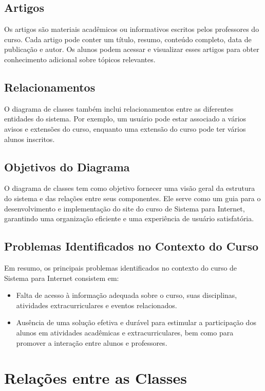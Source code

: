 \documentclass[a4paper,12pt]{report}
\begin{document}
\subsection{Artigos}
 
Os artigos são materiais acadêmicos ou informativos escritos pelos professores do curso. Cada artigo pode conter um título, resumo, conteúdo completo, data de publicação e autor. Os alunos podem acessar e visualizar esses artigos para obter conhecimento adicional sobre tópicos relevantes.
 
\subsection{Relacionamentos}
 
O diagrama de classes também inclui relacionamentos entre as diferentes entidades do sistema. Por exemplo, um usuário pode estar associado a vários avisos e extensões do curso, enquanto uma extensão do curso pode ter vários alunos inscritos.
 
\subsection{Objetivos do Diagrama}
 
O diagrama de classes tem como objetivo fornecer uma visão geral da estrutura do sistema e das relações entre seus componentes. Ele serve como um guia para o desenvolvimento e implementação do site do curso de Sistema para Internet, garantindo uma organização eficiente e uma experiência de usuário satisfatória.

\subsection{Problemas Identificados no Contexto do Curso}
 
Em resumo, os principais problemas identificados no contexto do curso de Sistema para Internet consistem em:
\begin{itemize}
    \item Falta de acesso à informação adequada sobre o curso, suas disciplinas, atividades extracurriculares e eventos relacionados.
    \item Ausência de uma solução efetiva e durável para estimular a participação dos alunos em atividades acadêmicas e extracurriculares, bem como para promover a interação entre alunos e professores.
\end{itemize}
 
\section{Relações entre as Classes} 
  
\end{document}
